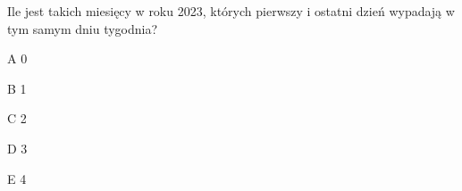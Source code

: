 \begin{tresc}
Ile jest takich miesięcy w roku 2023, których pierwszy i ostatni dzień wypadają w tym samym dniu tygodnia?
\end{tresc}
\begin{wariant}{A} 0 \end{wariant}
\begin{wariant}{B} 1 \end{wariant}
\begin{wariant}{C} 2 \end{wariant}
\begin{wariant}{D} 3 \end{wariant}
\begin{wariant}{E} 4 \end{wariant}
